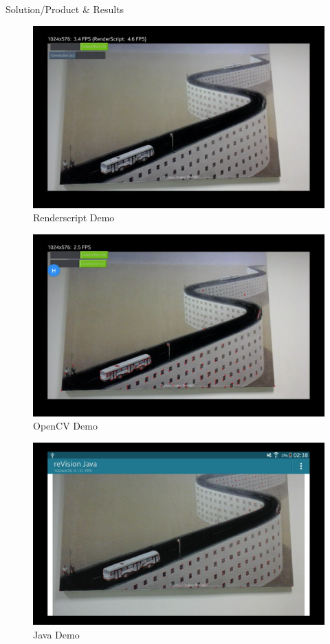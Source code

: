 \documentclass[12pt, a4paper]{article} \pagenumbering{gobble}
\begin{document}
\begin{section}{Solution/Product \& Results}
{  \begin{figure}[h]
    \centering
    \includegraphics[scale=0.25]{renderscript.png}
    \caption{Renderscript Demo}
    \label{fig:mesh2}
  \end{figure}

  \begin{figure}[h]
    \centering
    \includegraphics[scale=0.25]{opencv.png}
    \caption{OpenCV Demo}
    \label{fig:mesh3}
  \end{figure}

  \begin{figure}[h]
    \centering
    \includegraphics[scale=0.25]{java.png}
    \caption{Java Demo}
    \label{fig:mesh4}
  \end{figure}
}
\end{section}
\end{document}
